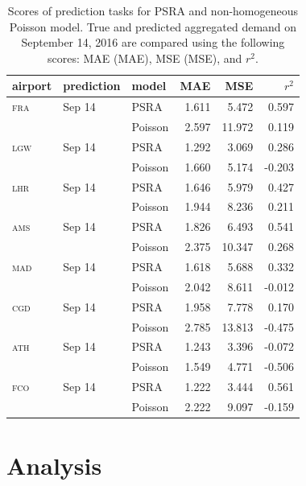 \documentclass[final,review]{elsarticle}
\newcommand{\airp}[1]{\textcolor{#1}{\textsc{#1}}}
\begin{document}
\begin{table}
  \centering
  \caption{Scores of prediction tasks for \acs{PSRA} and non-homogeneous Poisson model. True and predicted aggregated demand on September 14, 2016 are compared using the following scores: \acl{MAE} (\acs{MAE}), \acl{MSE} (\acs{MSE}), and \(r^2\).}\label{tab:predictions_last_day}
  \begin{tabular}{lllrrr}
    \toprule
    airport    & prediction & model & \acs{MAE} & \acs{MSE} & \(r^2\)  \\
    \midrule
    \airp{fra} & Sep 14    & \acs{PSRA} &  1.611 &   5.472 &  0.597 \\
         &                  & Poisson    &  2.597 &  11.972 &  0.119 \\
    \airp{lgw} & Sep 14    & \acs{PSRA} &  1.292 &   3.069 &  0.286 \\
         &                  & Poisson    &  1.660 &   5.174 & -0.203 \\
    \airp{lhr} & Sep 14    & \acs{PSRA} &  1.646 &   5.979 &  0.427 \\
         &                  & Poisson    &  1.944 &   8.236 &  0.211 \\
    \airp{ams} & Sep 14    & \acs{PSRA} &  1.826 &   6.493 &  0.541 \\
         &                  & Poisson    &  2.375 &  10.347 &  0.268 \\
    \airp{mad} & Sep 14    & \acs{PSRA} &  1.618 &   5.688 &  0.332 \\
         &                  & Poisson    &  2.042 &   8.611 & -0.012 \\
    \airp{cgd} & Sep 14    & \acs{PSRA} &  1.958 &   7.778 &  0.170 \\
         &                  & Poisson    &  2.785 &  13.813 & -0.475 \\
    \airp{ath} & Sep 14    & \acs{PSRA} &  1.243 &   3.396 & -0.072 \\
         &                  & Poisson    &  1.549 &   4.771 & -0.506 \\
    \airp{fco} & Sep 14    & \acs{PSRA} &  1.222 &   3.444 &  0.561 \\
         &                  & Poisson    &  2.222 &   9.097 & -0.159 \\
    \bottomrule
  \end{tabular}
\end{table}

\section{Analysis}\label{sec:analysis}
\end{document}
